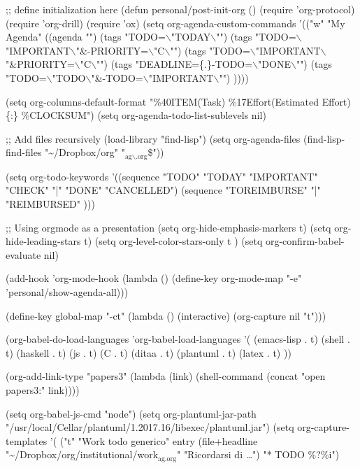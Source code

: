 \documentclass[presentation]{beamer}
\begin{document}
;; define initialization here
(defun personal/post-init-org ()
  (require 'org-protocol)
  (require 'org-drill)
  (require 'ox)
  (setq org-agenda-custom-commands '(("w" "My Agenda"
                                      ((agenda "")
                                       (tags "TODO=$\backslash$"TODAY$\backslash$"")
                                       (tags "TODO=$\backslash$"IMPORTANT$\backslash$"\&-PRIORITY=$\backslash$"C$\backslash$"")
                                       (tags "TODO=$\backslash$"IMPORTANT$\backslash$"\&PRIORITY=$\backslash$"C$\backslash$"")
                                       (tags "DEADLINE=\{.\}-TODO=$\backslash$"DONE$\backslash$"")
                                       (tags "TODO=$\backslash$"TODO$\backslash$"\&-TODO=$\backslash$"IMPORTANT$\backslash$"")
                                       ))))

(setq org-columns-default-format "\%40ITEM(Task) \%17Effort(Estimated Effort)\{:\} \%CLOCKSUM") 
(setq org-agenda-todo-list-sublevels nil)

;; Add files recursively
(load-library "find-lisp")
(setq org-agenda-files
      (find-lisp-find-files "\textasciitilde{}/Dropbox/org" "\(_{\text{ag$\backslash$.org}}\)\$"))

(setq org-todo-keywords
      '((sequence "TODO" "TODAY" "IMPORTANT" "CHECK" "|" "DONE" "CANCELLED")
        (sequence "TOREIMBURSE" "|" "REIMBURSED"  )))

;; Using orgmode as a presentation
(setq org-hide-emphasis-markers t)
(setq org-hide-leading-stars t)
(setq org-level-color-stars-only t )
(setq org-confirm-babel-evaluate nil)

(add-hook 'org-mode-hook (lambda () 
                           (define-key org-mode-map "\M-e" 'personal/show-agenda-all)))

(define-key global-map "\C-ct"
  (lambda () (interactive) (org-capture nil "t")))

(org-babel-do-load-languages
 'org-babel-load-languages
 '(
   (emacs-lisp . t)
   (shell . t)
   (haskell . t)
   (js . t)
   (C . t)  
   (ditaa . t)
   (plantuml . t)
   (latex . t)
   ))


(org-add-link-type "papers3" (lambda (link)  (shell-command (concat "open papers3:" link))))

(setq org-babel-js-cmd "node")
(setq org-plantuml-jar-path "/usr/local/Cellar/plantuml/1.2017.16/libexec/plantuml.jar")
(setq org-capture-templates
      '(
        ("t" "Work todo generico" entry
         (file+headline "\textasciitilde{}/Dropbox/org/institutional/work\(_{\text{ag.org}}\)" "Ricordarsi di \ldots{}")
         "* TODO \%?\n  \%i\n")
\end{document}
